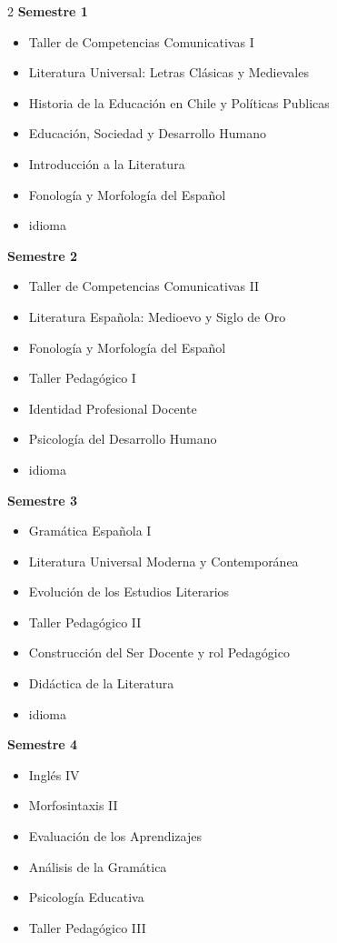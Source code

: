 \documentclass[12pt,a4paper]{article}
\begin{document}
	\begin{multicols}{2}
		\textbf{Semestre 1}
		\begin{itemize}
			\item Taller de Competencias Comunicativas I
			\item Literatura Universal: Letras Clásicas y Medievales
			\item Historia de la Educación en Chile y Políticas Publicas
			\item Educación, Sociedad y Desarrollo Humano
			\item Introducción a la Literatura
			\item Fonología y Morfología del Español
			\item idioma
		\end{itemize}
		
		\textbf{Semestre 2}
		\begin{itemize}
			\item Taller de Competencias Comunicativas II
			\item Literatura Española: Medioevo y Siglo de Oro
			\item Fonología y Morfología del Español
			\item Taller Pedagógico I
			\item Identidad Profesional Docente
			\item Psicología del Desarrollo Humano
			\item idioma
		\end{itemize}
		
		\textbf{Semestre 3}
		\begin{itemize}
			\item Gramática Española I
			\item Literatura Universal Moderna y Contemporánea
			\item Evolución de los Estudios Literarios
			\item Taller Pedagógico II
			\item Construcción del Ser Docente y rol Pedagógico
			\item Didáctica de la Literatura
			\item idioma
		\end{itemize}
		
		\textbf{Semestre 4}
		\begin{itemize}
			\item Inglés IV
			\item Morfosintaxis II
			\item Evaluación de los Aprendizajes
			\item Análisis de la Gramática
			\item Psicología Educativa
			\item Taller Pedagógico III
		\end{itemize}
		

\end{multicols}
\end{document}
